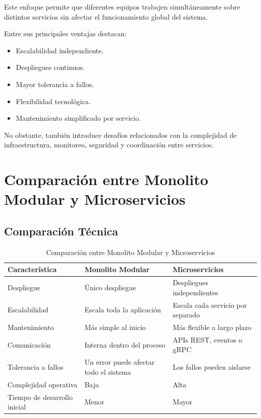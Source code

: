 \documentclass[12pt,a4paper]{article}
\begin{document}
Este enfoque permite que diferentes equipos trabajen simultáneamente sobre distintos servicios sin afectar el funcionamiento global del sistema.

Entre sus principales ventajas destacan:

\begin{itemize}
\item Escalabilidad independiente.
\item Despliegues continuos.
\item Mayor tolerancia a fallos.
\item Flexibilidad tecnológica.
\item Mantenimiento simplificado por servicio.
\end{itemize}

No obstante, también introduce desafíos relacionados con la complejidad de infraestructura, monitoreo, seguridad y coordinación entre servicios.

\section{Comparación entre Monolito Modular y Microservicios}

\subsection{Comparación Técnica}

\begin{table}[h]
\centering
\begin{tabular}{|p{4cm}|p{4cm}|p{4cm}|}
\hline
\textbf{Característica} & \textbf{Monolito Modular} & \textbf{Microservicios} \\
\hline
Despliegue & Único despliegue & Despliegues independientes \\
\hline
Escalabilidad & Escala toda la aplicación & Escala cada servicio por separado \\
\hline
Mantenimiento & Más simple al inicio & Más flexible a largo plazo \\
\hline
Comunicación & Interna dentro del proceso & APIs REST, eventos o gRPC \\
\hline
Tolerancia a fallos & Un error puede afectar todo el sistema & Los fallos pueden aislarse \\
\hline
Complejidad operativa & Baja & Alta \\
\hline
Tiempo de desarrollo inicial & Menor & Mayor \\
\hline
\end{tabular}
\caption{Comparación entre Monolito Modular y Microservicios}
\label{tab:comparacion}
\end{table}
\end{document}
